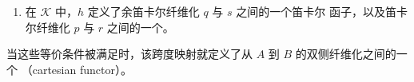 \begin{proposition}
\begin{enumerate}[label=(\roman*)]
\begin{center}
\end{center}
的对应定义了 $\mathcal{K}_{/A\times B}$ 中的同构。
\item 在 $\mathcal{K}$ 中，$h$ 定义了余笛卡尔纤维化 $q$ 与 $s$ 之间的一个笛卡尔
函子，以及笛卡尔纤维化 $p$ 与 $r$ 之间的一个\trCartesianFunctor{}。
\end{enumerate}
当这些等价条件被满足时，该跨度映射就定义了从 $A$ 到 $B$ 的双侧纤维化之间的一个%
\textbf{\trCartesianFunctor}（cartesian functor）。
\end{proposition}

